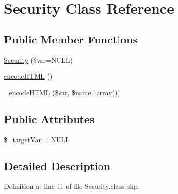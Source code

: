 \hypertarget{classSecurity}{\section{Security Class Reference}
\label{classSecurity}
}
\subsection*{Public Member Functions}
\begin{DoxyCompactItemize}
\item 
\hyperlink{classSecurity_ab74d8099e74ecc760f9328fce70760c7}{Security} (\$var=N\+U\+L\+L)
\item 
\hyperlink{classSecurity_a55da0eb544c3f7eeb6f818578fd0b393}{encode\+H\+T\+M\+L} ()
\item 
\hyperlink{classSecurity_a70d05408553b1e5d0022272d064b5085}{\+\_\+encode\+H\+T\+M\+L} (\$var, \$name=array())
\end{DoxyCompactItemize}
\subsection*{Public Attributes}
\begin{DoxyCompactItemize}
\item 
\hyperlink{classSecurity_a28ff37b08bd7a592552cf5af13f7ac74}{\$\+\_\+target\+Var} = N\+U\+L\+L
\end{DoxyCompactItemize}


\subsection{Detailed Description}


Definition at line 11 of file Security.\+class.\+php.



